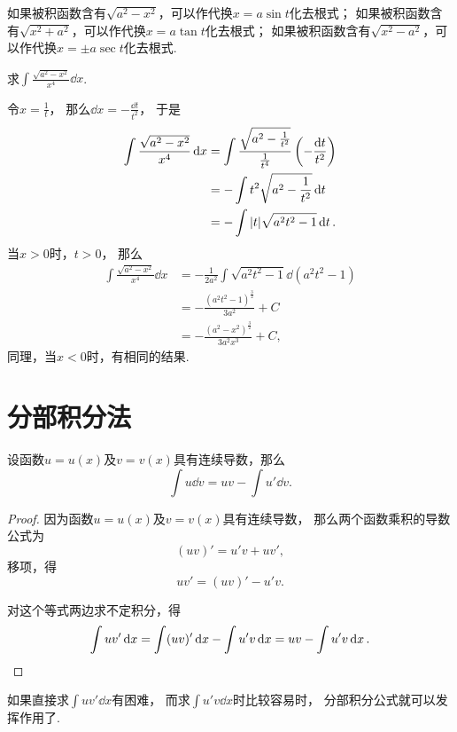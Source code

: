 \begin{remark}
如果被积函数含有\(\sqrt{a^2 - x^2}\)，可以作代换\(x = a \sin t\)化去根式；
如果被积函数含有\(\sqrt{x^2 + a^2}\)，可以作代换\(x=a \tan t\)化去根式；
如果被积函数含有\(\sqrt{x^2 - a^2}\)，可以作代换\(x=\pm a \sec t\)化去根式.
\end{remark}

\begin{example}
求\(\int \frac{\sqrt{a^2 - x^2}}{x^4} \dd{x}\).
\begin{solution}
令\(x = \frac{1}{t}\)，
那么\(\dd{x} = -\frac{\dd{t}}{t^2}\)，
于是\begin{align*}
	\int \frac{\sqrt{a^2 - x^2}}{x^4} \dd{x}
	&= \int \frac{\sqrt{a^2 - \frac{1}{t^2}}}{\frac{1}{t^4}}
		\left( -\frac{\dd{t}}{t^2} \right) \\
	&= -\int t^2 \sqrt{a^2 - \frac{1}{t^2}} \dd{t} \\
	&= -\int \abs{t} \sqrt{a^2 t^2 - 1} \dd{t}.
\end{align*}
当\(x > 0\)时，\(t > 0\)，
那么\begin{align*}
	\int \frac{\sqrt{a^2 - x^2}}{x^4} \dd{x}
	&= -\frac{1}{2a^2} \int \sqrt{a^2 t^2 - 1} \dd(a^2 t^2 - 1) \\
	&= -\frac{(a^2 t^2 - 1)^{\frac32}}{3 a^2} + C \\
	&= -\frac{(a^2 - x^2)^{\frac32}}{3 a^2 x^3} + C,
\end{align*}
同理，当\(x < 0\)时，有相同的结果.
\end{solution}
\end{example}

\section{分部积分法}
\begin{theorem}[分部积分公式]
设函数\(u=u(x)\)及\(v=v(x)\)具有连续导数，那么\[
	\int u \dd{v} = uv - \int u' \dd{v}.
\]
\begin{proof}
因为函数\(u=u(x)\)及\(v=v(x)\)具有连续导数，
那么两个函数乘积的导数公式为\[
	(uv)' = u'v + uv',
\]
移项，得\[
	uv' = (uv)' - u'v.
\]

对这个等式两边求不定积分，得\[
	\int u v' \dd{x} = \int (uv)' \dd{x} - \int u' v \dd{x}
	= uv - \int u' v \dd{x}.
	\qedhere
\]
\end{proof}
\end{theorem}
如果直接求\(\int u v' \dd{x}\)有困难，
而求\(\int u' v \dd{x}\)时比较容易时，
分部积分公式就可以发挥作用了.

